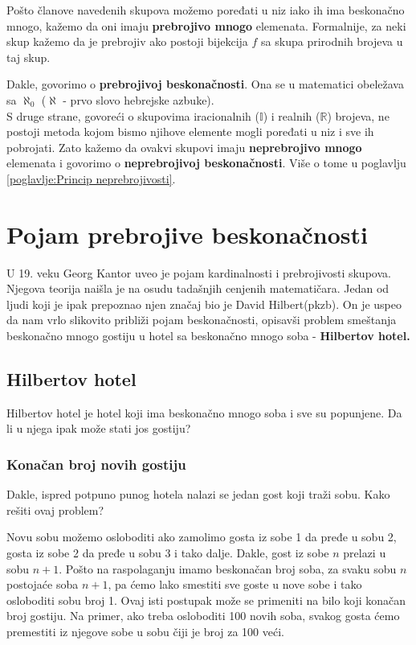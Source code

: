 \documentclass[a4paper]{article}
\begin{document}
Pošto članove navedenih skupova možemo poređati u niz iako ih ima beskonačno mnogo, kažemo da oni imaju \textbf{prebrojivo mnogo} elemenata. Formalnije, za neki skup kažemo da je prebrojiv ako postoji bijekcija $f$ sa skupa prirodnih brojeva u taj skup\cite{klaric2016}.

Dakle, govorimo o \textbf{prebrojivoj beskonačnosti}. Ona se u matematici obeležava sa $\aleph_{0}$ ($\aleph$ - prvo slovo hebrejske azbuke).\\

S druge strane, govoreći o skupovima iracionalnih ($\mathbb{I}$) i realnih ($\mathbb{R}$) brojeva, ne postoji metoda kojom bismo njihove elemente mogli poređati u niz i sve ih pobrojati. Zato kažemo da ovakvi skupovi imaju \textbf{neprebrojivo mnogo} elemenata i govorimo o \textbf{neprebrojivoj beskonačnosti}. Više o tome u poglavlju \ref{poglavlje:Princip neprebrojivosti}.


\newpage

\section{Pojam prebrojive beskonačnosti}
\label{poglavlje:Pojam prebrojive beskonačnosti}
U 19. veku Georg Kantor uveo je pojam kardinalnosti i prebrojivosti skupova. Njegova teorija naišla je na osudu tadašnjih cenjenih matematičara.
Jedan od ljudi koji je ipak prepoznao njen značaj bio je David Hilbert(pkzb).
On je uspeo da nam vrlo slikovito približi pojam beskonačnosti, opisavši problem smeštanja beskonačno mnogo gostiju u hotel sa beskonačno mnogo soba - \textbf{Hilbertov hotel.}

\subsection{Hilbertov hotel}
Hilbertov hotel je hotel koji ima beskonačno mnogo soba i sve su popunjene. Da li u njega ipak može stati jos gostiju?

\subsubsection{Konačan broj novih gostiju}
\label{potpotpoglavlje:Konačan broj novih gostiju}
Dakle, ispred potpuno punog hotela nalazi se jedan gost koji traži sobu. Kako rešiti ovaj problem?

Novu sobu možemo osloboditi ako zamolimo gosta iz sobe 1 da pređe u sobu 2, gosta iz sobe 2 da pređe u sobu 3 i tako dalje. Dakle, gost iz sobe $n$ prelazi u sobu $n+1$.
Pošto na raspolaganju imamo beskonačan broj soba, za svaku sobu $n$ postojaće soba $n+1$, pa ćemo lako smestiti sve goste u nove sobe i tako osloboditi sobu broj 1.
Ovaj isti postupak može se primeniti na bilo koji konačan broj gostiju. Na primer, ako treba osloboditi 100 novih soba, svakog gosta ćemo premestiti iz njegove sobe u sobu čiji je broj za 100 veći.
\end{document}
